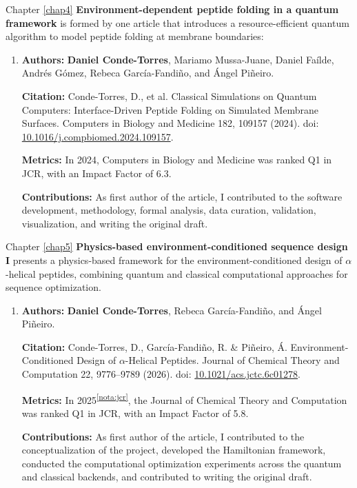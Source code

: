 Chapter \ref{chap4} \textbf{Environment-dependent peptide folding in a quantum framework} is formed by one article that introduces a resource-efficient quantum algorithm to model peptide folding at membrane boundaries:
\begin{enumerate}
    \item \textbf{Authors:} \textbf{Daniel Conde-Torres}, Mariamo Mussa-Juane, Daniel Faílde, Andrés Gómez, Rebeca García-Fandiño, and Ángel Piñeiro.

    \textbf{Citation:} Conde-Torres, D., et al. Classical Simulations on Quantum Computers: Interface-Driven Peptide Folding on Simulated Membrane Surfaces. Computers in Biology and Medicine 182, 109157 (2024). doi: \href{https://doi.org/10.1016/j.compbiomed.2024.109157}{10.1016/j.compbiomed.2024.109157}.

    \textbf{Metrics:} In 2024, Computers in Biology and Medicine was ranked Q1 in JCR, with an Impact Factor of 6.3.

    \textbf{Contributions:} As first author of the article, I contributed to the software development, methodology, formal analysis, data curation, validation, visualization, and writing the original draft.
\end{enumerate}






Chapter \ref{chap5} \textbf{Physics-based environment-conditioned sequence design I} presents a physics-based framework for the environment-conditioned design of $\alpha$-helical peptides, combining quantum and classical computational approaches for sequence optimization.\begin{enumerate}
    \item \textbf{Authors:} \textbf{Daniel Conde-Torres}, Rebeca García-Fandiño, and Ángel Piñeiro.
    
    \textbf{Citation:} Conde-Torres, D., García-Fandiño, R. \& Piñeiro, Á. Environment-Conditioned Design of $\alpha$-Helical Peptides. Journal of Chemical Theory and Computation 22, 9776--9789 (2026). doi: \href{https://doi.org/10.1021/acs.jctc.6c01278}{10.1021/acs.jctc.6c01278}.
    
    \textbf{Metrics:} In 2025\textsuperscript{\ref{nota:jcr}}, the Journal of Chemical Theory and Computation was ranked Q1 in JCR, with an Impact Factor of 5.8.
    
    \textbf{Contributions:} As first author of the article, I contributed to the conceptualization of the project, developed the Hamiltonian framework, conducted the computational optimization experiments across the quantum and classical backends, and contributed to writing the original draft.
\end{enumerate}




